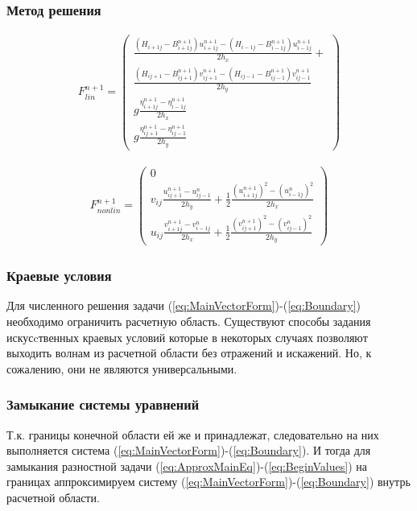 \documentclass[14pt]{beamer}
\begin{document}
\begin{frame}
\frametitle{Метод решения}

\begin{eqnarray}
\label{eq:ApproxFLin}
F^{n+1}_{lin}=\begin{pmatrix}
\frac{(H_{i+1j}-B_{i+1j}^{n+1})u_{i+1j}^{n+1}-(H_{i-1j}-B_{i-1j}^{n+1})u_{i-1j}^{n+1}}{2h_x}+\\
\frac{(H_{ij+1}-B_{ij+1}^{n+1})v_{ij+1}^{n+1}-(H_{ij-1}-B_{ij-1}^{n+1})v_{ij-1}^{n+1}}{2h_y}\\
g\frac{\eta_{i+1j}^{n+1}-\eta_{i-1j}^{n+1}}{2h_x}\\
g\frac{\eta_{ij+1}^{n+1}-\eta_{ij-1}^{n+1}}{2h_y}
\end{pmatrix}
\end{eqnarray}

\begin{eqnarray}
\label{eq:ApproxFNonlin}
F^{n+1}_{nonlin}=\begin{pmatrix}
0\\
v_{ij}\frac{u_{ij+1}^{n+1}-u_{ij-1}^{n}}{2h_y}+
\frac{1}{2}\frac{(u_{i+1j}^{n+1})^2-(u_{i-1j}^{n})^2}{2h_x}\\
u_{ij}\frac{v_{i+1j}^{n+1}-v_{i-1j}^{n}}{2h_x}+
\frac{1}{2}\frac{(v_{ij+1}^{n+1})^2-(v_{ij-1}^{n})^2}{2h_y}
\end{pmatrix}
\end{eqnarray}
\end{frame}

\begin{frame}
\frametitle{Краевые условия}
Для численного решения задачи (\ref{eq:MainVectorForm})-(\ref{eq:Boundary}) необходимо ограничить расчетную область. Существуют способы задания искусcтвенных краевых условий которые в некоторых случаях позволяют выходить волнам из расчетной области без отражений и искажений. Но, к сожалению, они не являются универсальными.
\end{frame}


\begin{frame}
\frametitle{Замыкание системы уравнений}
Т.к. границы конечной области ей же и принадлежат, следовательно на них выполняется система  (\ref{eq:MainVectorForm})-(\ref{eq:Boundary}). И тогда для замыкания разностной задачи (\ref{eq:ApproxMainEq})-(\ref{eq:BeginValues}) на границах аппроксимируем систему (\ref{eq:MainVectorForm})-(\ref{eq:Boundary}) внутрь расчетной области.
\end{frame}
\end{document}
